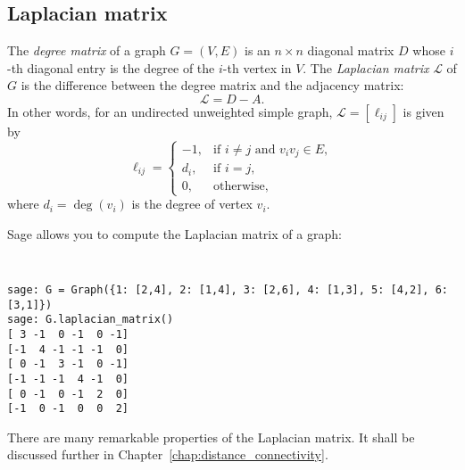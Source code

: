%



\subsection{Laplacian matrix}

The \emph{degree matrix} of a graph $G = (V,E)$ is an $n \times n$
diagonal matrix $D$ whose $i$-th diagonal entry is the degree of the
$i$-th vertex in $V$.
The \emph{Laplacian matrix} $\mathcal{L}$ of $G$ is the difference
between the degree matrix and the adjacency matrix:
\[
\mathcal{L} = D - A.
\]
In other words, for an undirected unweighted simple graph,
$\mathcal{L} = [\ell_{ij}]$ is given by
\[
\ell_{ij}
=
\begin{cases}
-1,  & \text{if $i \neq j$ and $v_i v_j \in E$}, \\
d_i, & \text{if $i = j$}, \\
0,   & \text{otherwise},
\end{cases}
\]
where $d_i = \deg(v_i)$ is the degree of vertex $v_i$.

Sage allows you to compute the Laplacian matrix of a graph:
%
\begin{center}
\fontsize{9pt}{9pt}
\selectfont
\tt
\begin{lstlisting}
sage: G = Graph({1: [2,4], 2: [1,4], 3: [2,6], 4: [1,3], 5: [4,2], 6: [3,1]})
sage: G.laplacian_matrix()
[ 3 -1  0 -1  0 -1]
[-1  4 -1 -1 -1  0]
[ 0 -1  3 -1  0 -1]
[-1 -1 -1  4 -1  0]
[ 0 -1  0 -1  2  0]
[-1  0 -1  0  0  2]
\end{lstlisting}
\end{center}
%
There are many remarkable properties of the Laplacian matrix. It shall
be discussed further in Chapter~\ref{chap:distance_connectivity}.


